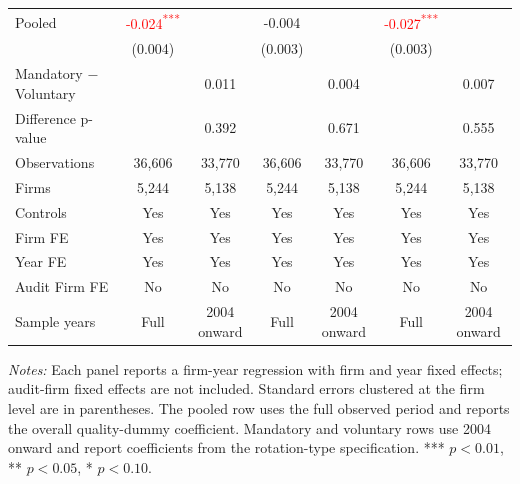\documentclass[10pt]{article}
\newcommand{\sym}[1]{\textsuperscript{#1}}
\begin{document}
\begin{minipage}{19cm}
\begin{threeparttable}
\begin{tabular}{l cc cc cc}
Pooled & \textcolor{red}{-0.024\sym{***}} &  & -0.004 &  & \textcolor{red}{-0.027\sym{***}} &  \\
 & (0.004) &  & (0.003) &  & (0.003) &  \\
Mandatory $-$ Voluntary &  & 0.011 &  & 0.004 &  & 0.007 \\
Difference p-value &  & 0.392 &  & 0.671 &  & 0.555 \\
Observations & 36,606 & 33,770 & 36,606 & 33,770 & 36,606 & 33,770 \\
Firms & 5,244 & 5,138 & 5,244 & 5,138 & 5,244 & 5,138 \\
\midrule
Controls & Yes & Yes & Yes & Yes & Yes & Yes \\
Firm FE & Yes & Yes & Yes & Yes & Yes & Yes \\
Year FE & Yes & Yes & Yes & Yes & Yes & Yes \\
Audit Firm FE & No & No & No & No & No & No \\
Sample years & Full & 2004 onward & Full & 2004 onward & Full & 2004 onward \\
\bottomrule
\end{tabular}
\begin{tablenotes}\fontsize{9}{11}\selectfont
\item \fontsize{9}{11}\selectfont \textit{Notes:} Each panel reports a firm-year regression with firm and year fixed effects; audit-firm fixed effects are not included. Standard errors clustered at the firm level are in parentheses. The pooled row uses the full observed period and reports the overall quality-dummy coefficient. Mandatory and voluntary rows use 2004 onward and report coefficients from the rotation-type specification. *** \(p<0.01\), ** \(p<0.05\), * \(p<0.10\).
\end{tablenotes}
\end{threeparttable}

\end{minipage}
\end{document}
